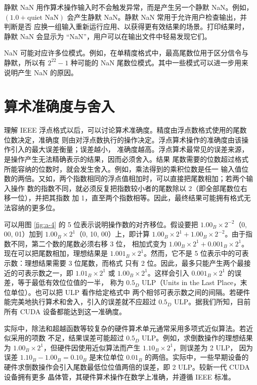 静默 NaN 用作算术操作输入时不会触发异常，而是产生另一个静默 NaN。例如，
$(1.0+\text{quiet NaN})$ 会产生静默 NaN。静默 NaN 常用于允许用户检查输出，并判断是否
应换一组输入重新运行应用、以获得更有效结果的场景。打印结果时，静默 NaN 会显示为
``NaN''，用户可以在输出文件中轻易发现它们。

NaN 可能对应许多位模式。例如，在单精度格式中，最高尾数位用于区分信令与静默，所以有
$2^{22}-1$ 种可能的 NaN 尾数位模式。其中一些模式可以进一步用来说明产生 NaN 的原因。

\section{算术准确度与舍入}
\label{sec:appa-accuracy-rounding}

理解 IEEE 浮点格式以后，可以讨论算术准确度。精度由浮点数格式使用的尾数位数决定，准确度
则由对浮点数执行的操作决定。浮点算术操作的准确度由该操作引入的最大误差衡量；误差越小，
准确度越高。浮点算术最常见的误差来源，是操作产生无法精确表示的结果，因而必须舍入。结果
尾数需要的位数超过格式所能容纳的位数时，就会发生舍入。例如，乘法得到的乘积位数是任一
输入值位数的两倍。又如，两个指数相同的浮点值相加时，可以直接把尾数相加；若两个输入操作
数的指数不同，就必须反复把指数较小者的尾数除以 2（即全部尾数位右移一位），并把其指数
加 1，直至两个指数相等。因此，最终结果可能拥有格式无法容纳的更多位。

可以用图 \ref{fig:a-4} 的 5 位表示说明操作数的对齐移位。假设要把
$1.00_B\times2^{-2}$（0, 00, 01）加到 $1.00_B\times2^1$（0, 10, 00）上，即计算
$1.00_B\times2^1+1.00_B\times2^{-2}$。由于指数不同，第二个数的尾数必须右移 3 位，
相加式变为
$1.00_B\times2^1+0.001_B\times2^1$。现在可以把尾数相加，理想结果是
$1.001_B\times2^1$。然而，它不是 5 位表示中的可表示数：理想结果需要 3 位尾数，而格式
只有 2 位。因此，最多只能产生两个最接近的可表示数之一，即 $1.01_B\times2^1$ 或
$1.00_B\times2^1$。这样会引入 $0.001_B\times2^1$ 的误差，等于最低有效位位值的一半，
称为 $0.5_D$ ULP（Units in the Last Place，末位单位）。也可以把 ULP 看作给定格式中
两个相邻可表示数之间的间隔。若硬件能完美地执行算术和舍入，引入的误差就不应超过
$0.5_D$ ULP。据我们所知，目前所有 CUDA 设备都能达到这一准确度。

实际中，除法和超越函数等较复杂的硬件算术单元通常采用多项式近似算法。若近似采用的项数
不足，结果误差可能超过 $0.5_D$ ULP。例如，求倒数操作的理想结果为
$1.00_B\times2^1$，但硬件因使用近似算法而产生 $1.10_B\times2^1$，则误差为 2 ULP，
因为误差 $1.10_B-1.00_B=0.10_B$ 是末位单位 $0.01_B$ 的两倍。实际中，一些早期设备的
硬件求倒数操作会引入尾数最低位位值两倍的误差，即 2 ULP。较新一代 CUDA 设备拥有更多
晶体管，其硬件算术操作在数学上准确，并遵循 IEEE 标准\cite{appa-cuda-fp}。

